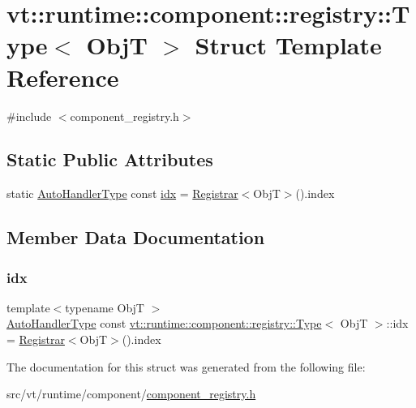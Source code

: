 \hypertarget{structvt_1_1runtime_1_1component_1_1registry_1_1_type}{}\section{vt\+:\+:runtime\+:\+:component\+:\+:registry\+:\+:Type$<$ ObjT $>$ Struct Template Reference}
\label{structvt_1_1runtime_1_1component_1_1registry_1_1_type}


{\ttfamily \#include $<$component\+\_\+registry.\+h$>$}

\subsection*{Static Public Attributes}
\begin{DoxyCompactItemize}
\item 
static \hyperlink{namespacevt_1_1runtime_1_1component_1_1registry_a9b86518797c7bb91babf0ca8ee7d06e6}{Auto\+Handler\+Type} const \hyperlink{structvt_1_1runtime_1_1component_1_1registry_1_1_type_ab078d45ada4ab2f2700f99e7d766057a}{idx} = \hyperlink{structvt_1_1runtime_1_1component_1_1registry_1_1_registrar}{Registrar}$<$ObjT$>$().index
\end{DoxyCompactItemize}


\subsection{Member Data Documentation}
\mbox{\label{structvt_1_1runtime_1_1component_1_1registry_1_1_type_ab078d45ada4ab2f2700f99e7d766057a}} 
\subsubsection{\texorpdfstring{idx}{idx}}
{\footnotesize\ttfamily template$<$typename ObjT $>$ \\
\hyperlink{namespacevt_1_1runtime_1_1component_1_1registry_a9b86518797c7bb91babf0ca8ee7d06e6}{Auto\+Handler\+Type} const \hyperlink{structvt_1_1runtime_1_1component_1_1registry_1_1_type}{vt\+::runtime\+::component\+::registry\+::\+Type}$<$ ObjT $>$\+::idx = \hyperlink{structvt_1_1runtime_1_1component_1_1registry_1_1_registrar}{Registrar}$<$ObjT$>$().index\hspace{0.3cm}{\ttfamily [static]}}



The documentation for this struct was generated from the following file\+:\begin{DoxyCompactItemize}
\item 
src/vt/runtime/component/\hyperlink{component__registry_8h}{component\+\_\+registry.\+h}\end{DoxyCompactItemize}
